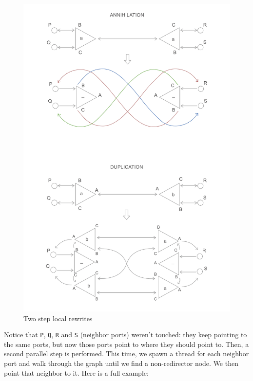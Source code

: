 \documentclass{article}
\theoremstyle{definition}
\theoremstyle{theorem}
\begin{document}
\begin{figure}[H]
  \includegraphics[width=\linewidth]{sk_local_rewrites_2x.png}
  \caption{Two step local rewrites}
\end{figure}

Notice that \verb|P|, \verb|Q|, \verb|R| and \verb|S| (neighbor ports) weren't
touched: they keep pointing to the same ports, but now those ports point to
where they should point to. Then, a second parallel step is performed. This
time, we spawn a thread for each neighbor port and walk through the graph until
we find a non-redirector node. We then point that neighbor to it. Here is a full
example:
\end{document}
